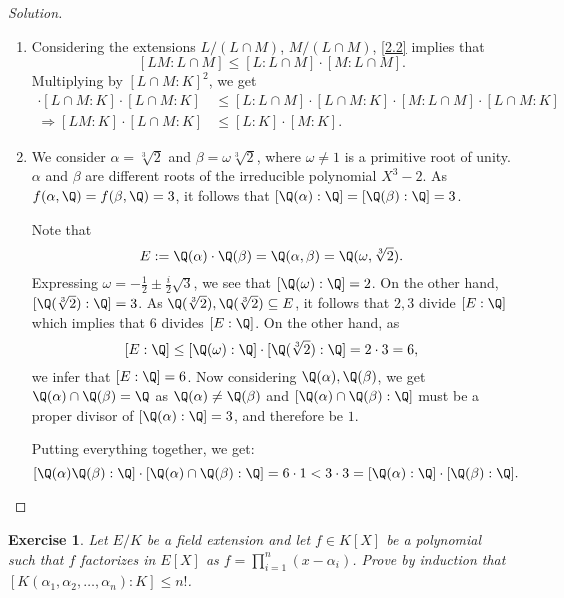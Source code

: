 \documentclass[a4paper,10pt,reqno]{amsart}
\newtheorem{ex}{Exercise}[section]
\newenvironment{sol}
  {\renewcommand\qedsymbol{$\blacksquare$}\begin{proof}[Solution]}
  {\end{proof}}
\begin{document}
\begin{sol}
    \begin{enumerate}[label=(\roman*)]
    \item Considering the extensions $L/(L \cap M)$, $M/(L \cap M)$, \cref{2.2} implies that
    \[
    [LM:L \cap M] \leq [L:L \cap M] \cdot [M:L \cap M].
    \]
    Multiplying by $[L \cap M:K]^2$, we get
    \begin{align*}
        [LM:L \cap M] \cdot [L \cap M:K] \cdot [L \cap M:K] & \leq [L:L \cap M] \cdot [L \cap M:K] \cdot [M:L \cap M] \cdot [L \cap M:K] \\
        \Rightarrow [LM:K] \cdot [L \cap M:K] & \leq [L:K] \cdot [M:K].
    \end{align*}
    \item We consider $\alpha = \sqrt[3]{2}$ and $\beta = \omega \sqrt[3]{2}$, where $\omega \neq 1$ is a primitive root of unity. $\alpha$ and $\beta$ are different roots of the irreducible polynomial $X^3-2$. As $f(\alpha,\Q) = f(\beta,\Q) = 3$, it follows that $[\Q(\alpha):\Q] = [\Q(\beta):\Q] = 3$.

    Note that
    \[
    E := \Q(\alpha)\cdot \Q(\beta) = \Q(\alpha,\beta) = \Q(\omega, \sqrt[3]{2}).
    \]
    Expressing $\omega = -\frac{1}{2} \pm \frac{i}{2}\sqrt{3}$, we see that $[\Q(\omega):\Q] = 2$. On the other hand, $[\Q(\sqrt[3]{2}):\Q] = 3$. As $\Q(\sqrt[3]{2}),\Q(\sqrt[3]{2}) \subseteq E$, it follows that $2,3$ divide $[E:\Q]$ which implies that $6$ divides $[E:\Q]$. On the other hand, as
    \[
    [E:\Q] \leq [\Q(\omega):\Q] \cdot [\Q(\sqrt[3]{2}):\Q] = 2 \cdot 3 = 6,
    \]
    we infer that $[E:\Q] = 6$. Now considering $\Q(\alpha),\Q(\beta)$, we get $\Q(\alpha) \cap \Q(\beta) = \Q$ as $\Q(\alpha) \neq \Q(\beta)$ and $[\Q(\alpha) \cap \Q(\beta):\Q]$ must be a proper divisor of $[\Q(\alpha):\Q] = 3$, and therefore be $1$.

    Putting everything together, we get:
    \[
    [\Q(\alpha)\Q(\beta):\Q] \cdot [\Q(\alpha) \cap \Q(\beta): \Q] = 6 \cdot 1 < 3 \cdot 3 = [\Q(\alpha):\Q] \cdot [\Q(\beta):\Q].\qedhere
    \]
    \end{enumerate}
\end{sol}

\begin{ex}
\label{3.6}
    Let $E/K$ be a field extension and let $f \in K[X]$ be a polynomial such that $f$ factorizes in $E[X]$ as $f = \prod_{i=1}^n(x - \alpha_i)$. Prove by induction that $[K(\alpha_1,\alpha_2, \ldots, \alpha_n):K] \leq n!$.
\end{ex}
\end{document}
